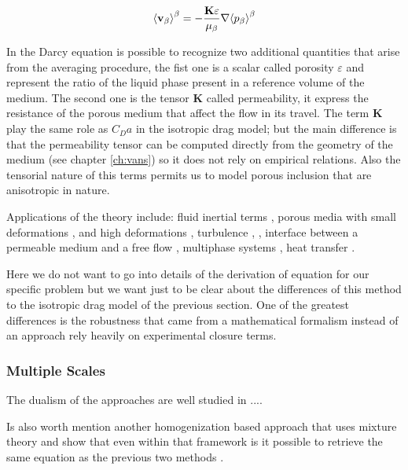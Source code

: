 \begin{equation}
{\left< \textbf{v}_{\beta} \right>}^{\beta} = -\dfrac{\mathbf{K} \varepsilon}{\mu_{\beta}} \nabla {\left< p_{\beta} \right>}^{\beta}
\label{eq:darcyeq}
\end{equation} 

In the Darcy equation is possible to recognize two additional quantities that arise from the averaging procedure, the fist one is a scalar called porosity $\varepsilon$ and represent the ratio of the liquid phase present in a reference volume of the medium.
The second one is the tensor $\mathbf{K}$ called permeability, it express the resistance of the porous medium that affect the flow in its travel.
The term $\mathbf{K}$ play the same role as $C_D a$ in the isotropic drag model; but the main difference is that the permeability tensor can be computed directly from the geometry of the medium (see chapter \ref{ch:vans}) so it does not rely on empirical relations.
Also the tensorial nature of this terms permits us to model porous inclusion that are anisotropic in nature.

Applications of the theory include: fluid inertial terms \citet{whitaker1996forchheimer}, porous media with small deformations \cite{whitaker1986flow2}, and high deformations \citet{hussong2011continuum}, turbulence \citet{soulaine2014}, \citet{breugem2006influence}, interface between a permeable medium and a free flow \citet{beavers1967boundary}, multiphase systems \citet{whitaker1973transport}, heat transfer \citet{carbonell1984heat}.

Here we do not want to go into details of the derivation of equation for our specific problem but we want just to be clear about the differences of this method to the isotropic drag model of the previous section.
One of the greatest differences is the robustness that came from a mathematical formalism instead of an approach rely heavily on experimental closure terms.

\subsubsection{Multiple Scales}


The dualism of the approaches are well studied in \cite{davit2013homogenization}....


Is also worth mention another homogenization based approach that uses mixture theory and show that even within that framework is it possible to retrieve the same equation as the previous two methods \citet{rajagopal2007hierarchy}.




